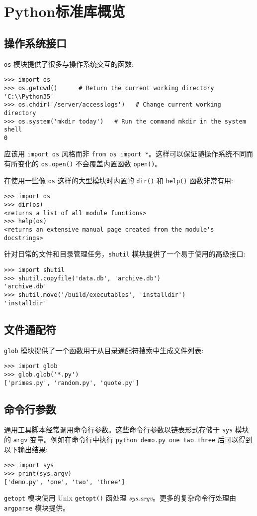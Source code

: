 \chapter{Python标准库概览\label{LibPartI}}
\section{操作系统接口}
\texttt{os} 模块提供了很多与操作系统交互的函数:
\begin{lstlisting}
>>> import os
>>> os.getcwd()      # Return the current working directory
'C:\\Python35'
>>> os.chdir('/server/accesslogs')   # Change current working directory
>>> os.system('mkdir today')   # Run the command mkdir in the system shell
0
\end{lstlisting}
应该用 \texttt{import os} 风格而非 \texttt{from os import *}。这样可以保证随操作系统不同而有所变化的 \texttt{os.open()} 不会覆盖内置函数 \texttt{open()}。

在使用一些像 \texttt{os} 这样的大型模块时内置的 \texttt{dir()} 和 \texttt{help()} 函数非常有用:
\begin{lstlisting}
>>> import os
>>> dir(os)
<returns a list of all module functions>
>>> help(os)
<returns an extensive manual page created from the module's docstrings>
\end{lstlisting}
针对日常的文件和目录管理任务，\texttt{shutil} 模块提供了一个易于使用的高级接口:
\begin{lstlisting}
>>> import shutil
>>> shutil.copyfile('data.db', 'archive.db')
'archive.db'
>>> shutil.move('/build/executables', 'installdir')
'installdir'
\end{lstlisting}
\section{文件通配符}
\texttt{glob} 模块提供了一个函数用于从目录通配符搜索中生成文件列表:
\begin{lstlisting}
>>> import glob
>>> glob.glob('*.py')
['primes.py', 'random.py', 'quote.py']
\end{lstlisting}
\section{命令行参数}
通用工具脚本经常调用命令行参数。这些命令行参数以链表形式存储于 \texttt{sys} 模块的 \texttt{argv} 变量。例如在命令行中执行 \texttt{python demo.py one two three} 后可以得到以下输出结果:
\begin{lstlisting}
>>> import sys
>>> print(sys.argv)
['demo.py', 'one', 'two', 'three']
\end{lstlisting}
\texttt{getopt} 模块使用 Unix \texttt{getopt()} 函处理 \textit{sys.argv}。更多的复杂命令行处理由 \texttt{argparse} 模块提供。
